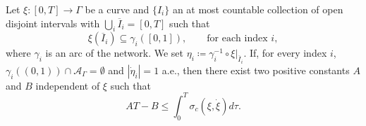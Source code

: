 \documentclass[11pt,a4paper,american]{article}
\newcommand{\Acal}{\mathcal A}
\newcommand{\ovI}{\overline I}
\begin{document}
    \begin{lem}\label{sigestauxbis}
        Let $\xi:[0,T]\to\Gamma$ be a curve and $\{I_i\}$ an at most countable collection of open disjoint intervals with $\bigcup_i\ovI_i=[0,T]$ such that
        \begin{equation*}
            \xi\left(\ovI_i\right)\subseteq\gamma_i([0,1]),\qquad\text{for each index }i,
        \end{equation*}
        where $\gamma_i$ is an arc of the network. We set $\eta_i\coloneqq\gamma_i^{-1}\circ\xi|_{\ovI_i}$. If, for every index $i$, $\gamma_i((0,1))\cap\Acal_\Gamma=\emptyset$ and $|\dot\eta_i|=1$ a.e., then there exist two positive constants $A$ and $B$ independent of $\xi$ such that
        \begin{equation}\label{eq:sigestauxbis.1}
            AT-B\le\int_0^T\sigma_c\left(\xi,\dot\xi\right)d\tau.
        \end{equation}
    \end{lem}
\end{document}
